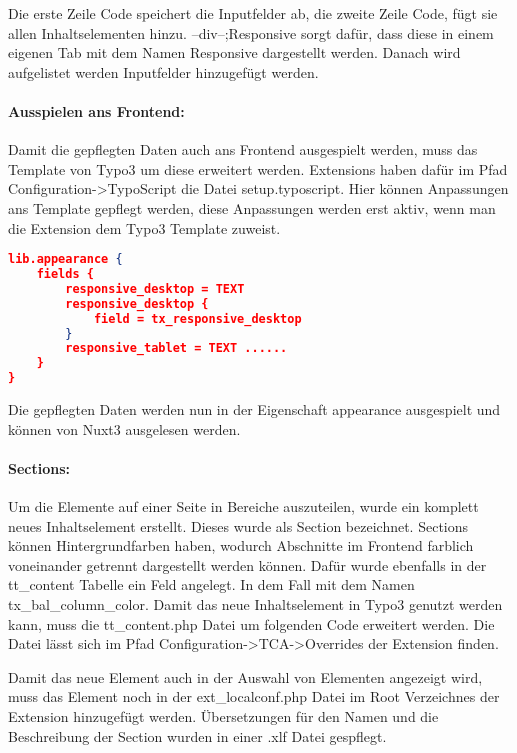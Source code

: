 Die erste Zeile Code speichert die Inputfelder ab, die zweite Zeile Code, fügt sie allen Inhaltselementen hinzu. --div--;Responsive sorgt dafür, dass diese in einem eigenen Tab mit dem Namen Responsive dargestellt werden. Danach wird aufgelistet werden Inputfelder hinzugefügt werden.

\paragraph{Ausspielen ans Frontend:}

Damit die gepflegten Daten auch ans Frontend ausgespielt werden, muss das Template von Typo3 um diese erweitert werden. Extensions haben dafür im Pfad \newline Configuration->TypoScript die Datei setup.typoscript. Hier können Anpassungen ans Template gepflegt werden, diese Anpassungen werden erst aktiv, wenn man die Extension dem Typo3 Template zuweist.

\begin{lstlisting}[language=json,firstnumber=1]
lib.appearance {
    fields {
        responsive_desktop = TEXT
        responsive_desktop {
            field = tx_responsive_desktop
        }
        responsive_tablet = TEXT ......
    }
}
\end{lstlisting}

Die gepflegten Daten werden nun in der Eigenschaft appearance ausgespielt und können von Nuxt3 ausgelesen werden.

\paragraph{Sections:}
Um die Elemente auf einer Seite in Bereiche auszuteilen, wurde ein komplett neues Inhaltselement erstellt. Dieses wurde als Section bezeichnet. Sections können Hintergrundfarben haben, wodurch Abschnitte im Frontend farblich voneinander getrennt dargestellt werden können. Dafür wurde ebenfalls in der tt\_content Tabelle ein Feld angelegt. In dem Fall mit dem Namen tx\_bal\_column\_color. Damit das neue Inhaltselement in Typo3 genutzt werden kann, muss die tt\_content.php Datei um folgenden Code erweitert werden.  \newline Die Datei lässt sich im Pfad Configuration->TCA->Overrides der Extension finden.

Damit das neue Element auch in der Auswahl von Elementen angezeigt wird, muss das Element noch in der ext\_localconf.php Datei im Root Verzeichnes der Extension hinzugefügt werden.\newline {} \newline Übersetzungen für den Namen und die Beschreibung der Section wurden in einer .xlf Datei gespflegt.


